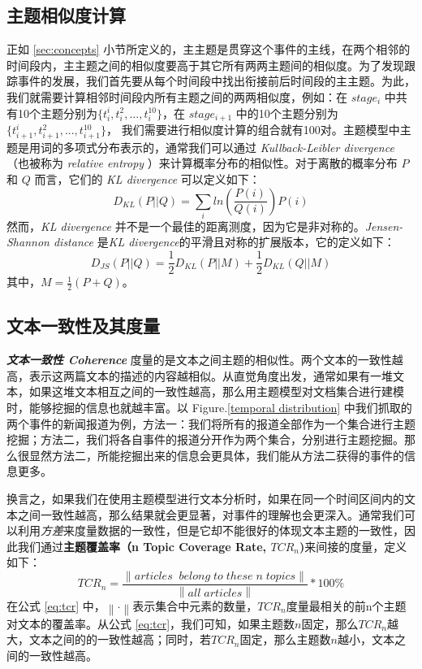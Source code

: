 \subsection{主题相似度计算}
\label{sec:similairty-calc}
正如 \ref{sec:concepts} 小节所定义的，主主题是贯穿这个事件的主线，在两个相邻的时间段内，主主题之间的相似度要高于其它所有两两主题间的相似度。为了发现跟踪事件的发展，我们首先要从每个时间段中找出衔接前后时间段的主主题。为此，我们就需要计算相邻时间段内所有主题之间的两两相似度，例如：在 $stage_i$ 中共有10个主题分别为$\{t_i^i, t_i^2, ..., t_i^{10}\}$，在 $stage_{i+1}$ 中的10个主题分别为 $\{t_{i+1}^i, t_{i+1}^2, ..., t_{i+1}^{10}\}$， 我们需要进行相似度计算的组合就有100对。主题模型中主题是用词的多项式分布表示的，通常我们可以通过 \emph{\emph{Kullback-Leibler divergence}}（也被称为 \emph{relative entropy} ）来计算概率分布的相似性。对于离散的概率分布 $P$ 和 $Q$ 而言，它们的 \emph{KL divergence}  可以定义如下：
\begin{equation}
D_{KL} \left ( P||Q \right ) = \sum_{i}ln\left ( \frac{P(i)}{Q(i)} \right ) P(i)
\end{equation}
然而，\emph{KL divergence} 并不是一个最佳的距离测度，因为它是非对称的。\emph{Jensen-Shannon distance} 是\emph{KL divergence}的平滑且对称的扩展版本，它的定义如下：
\begin{equation}
D_{JS} \left ( P||Q \right ) = \frac{1}{2} D_{KL} \left ( P||M \right ) + \frac{1}{2} D_{KL} \left ( Q||M \right )
\end{equation}
其中，$M = \frac{1}{2}(P+Q)$。

\subsection{文本一致性及其度量}
\textbf{\emph{文本一致性 Coherence}} 度量的是文本之间主题的相似性。两个文本的一致性越高，表示这两篇文本的描述的内容越相似。从直觉角度出发，通常如果有一堆文本，如果这堆文本相互之间的一致性越高，那么用主题模型对文档集合进行建模时，能够挖掘的信息也就越丰富。以 Figure.\ref{temporal distribution} 中我们抓取的两个事件的新闻报道为例，方法一：我们将所有的报道全部作为一个集合进行主题挖掘；方法二，我们将各自事件的报道分开作为两个集合，分别进行主题挖掘。那么很显然方法二，所能挖掘出来的信息会更具体，我们能从方法二获得的事件的信息更多。

换言之，如果我们在使用主题模型进行文本分析时，如果在同一个时间区间内的文本之间一致性越高，那么结果就会更显著，对事件的理解也会更深入。通常我们可以利用\emph{方差}来度量数据的一致性，但是它却不能很好的体现文本主题的一致性，因此我们通过\textbf{主题覆盖率（n Topic Coverage Rate, $TCR_n$)}来间接的度量，定义如下：
\begin{equation}
\label{eq:tcr}
TCR_n = \frac{\left \| articles\;\;belong\;to\;these\;n\;topics \right \|}{\left \| all\;articles \right \|} * 100\%
\end{equation}
在公式 \ref{eq:tcr} 中，$\left \| \cdot \right \|$表示集合中元素的数量，$TCR_n$度量最相关的前n个主题对文本的覆盖率。从公式 \ref{eq:tcr}，我们可知，如果主题数$n$固定，那么$TCR_n$越大，文本之间的的一致性越高；同时，若$TCR_n$固定，那么主题数$n$越小，文本之间的一致性越高。

